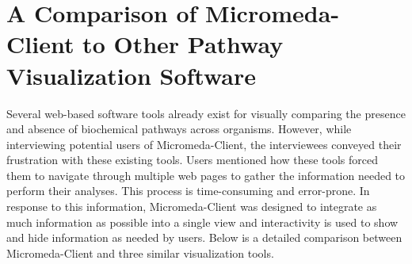 \section{A Comparison of Micromeda-Client to Other Pathway Visualization 
Software} \label{visualization-comparison}

Several web-based software tools already exist for visually comparing the 
presence and absence of biochemical pathways across organisms. However, while 
interviewing potential users of Micromeda-Client, the interviewees conveyed 
their frustration with these existing tools. Users mentioned how these tools 
forced them to navigate through multiple web pages to gather the information 
needed to perform their analyses. This process is time-consuming and 
error-prone. In response to this information, Micromeda-Client was designed to 
integrate as much information as possible into a single view and interactivity 
is used to show and hide information as needed by users. Below is a detailed 
comparison between Micromeda-Client and three similar visualization tools.

